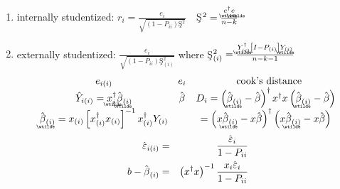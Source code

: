 \documentclass{article}
\begin{document}
\begin{enumerate}
\item internally studentized: $r_{i}=\frac{e_{i}}{\sqrt{\left(
1-P_{ii}\right) \text{\c{S}}^{2}}}\quad $\c{S}$^{2}=\frac{%
\underaccent{\wtilde}{e}%
^{\dagger }%
\underaccent{\wtilde}{e}%
}{n-k}$

\item externally studentized: $\frac{e_{i}}{\sqrt{\left( 1-P_{ii}\right) 
\text{\c{S}}_{\left( i\right) }^{2}}}$\newline
where \c{S}$_{\left( i\right) }^{2}=\frac{%
\underaccent{\wtilde}{Y}%
_{\left( i\right) }^{\dagger }\left[ I-P_{\left( i\right) }\right] 
\underaccent{\wtilde}{Y}%
_{\left( i\right) }}{n-k-1}$%
\begin{equation*}
\begin{array}{ccc}
e_{i\left( i\right) } & e_{i} & \text{cook's distance} \\ 
\hat{Y}_{i\left( i\right) }=%
\underaccent{\wtilde}{x}%
_{i}^{\dagger }%
\underaccent{\wtilde}{\hat{\beta}}%
_{\left( i\right) } & \hat{\beta} & D_{i}=\left( 
\underaccent{\wtilde}{\hat{\beta}}%
_{\left( i\right) }-\hat{\beta}\right) ^{\dagger }x^{\dagger }x\left( 
\underaccent{\wtilde}{\hat{\beta}}%
_{\left( i\right) }-\hat{\beta}\right)  \\ 
\underaccent{\wtilde}{\hat{\beta}}%
_{\left( i\right) }=x_{\left( i\right) }\left[ x_{\left( i\right) }^{\dagger
}x_{\left( i\right) }\right] ^{-1}x_{\left( i\right) }^{\dagger }Y_{\left(
i\right) } &  & =\left( x%
\underaccent{\wtilde}{\hat{\beta}}%
_{\left( i\right) }-x\hat{\beta}\right) ^{\dagger }\left( x%
\underaccent{\wtilde}{\hat{\beta}}%
_{\left( i\right) }-x\hat{\beta}\right) 
\end{array}%
\end{equation*}%
\begin{eqnarray*}
\hat{\varepsilon}_{i\left( i\right) } &=&\frac{\hat{\varepsilon}_{i}}{%
1-P_{ii}} \\
b-\hat{\beta}_{\left( i\right) } &=&\left( x^{\dagger }x\right) ^{-1}\frac{%
x_{i}\hat{\varepsilon}_{i}}{1-P_{ii}}
\end{eqnarray*}
\end{enumerate}
\end{document}
